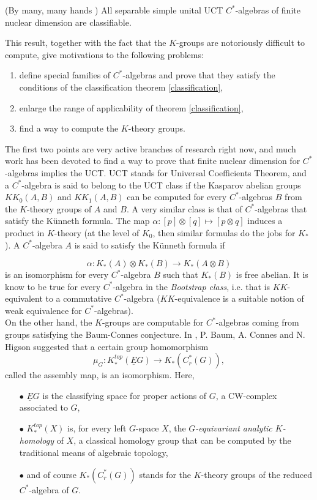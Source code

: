 \begin{theorem}\label{classification}(By many, many hands \cite{WinterClassification}) All separable simple unital UCT $C^*$-algebras of finite nuclear dimension are classifiable.
\end{theorem}

This result, together with the fact that the $K$-groups are notoriously difficult to compute, give motivations to the following problems:
\begin{enumerate}
\item define special families of $C^*$-algebras and prove that they satisfy the conditions of the classification theorem \ref{classification},
\item enlarge the range of applicability of theorem \ref{classification},
\item find a way to compute the $K$-theory groups.
\end{enumerate}    

The first two points are very active branches of research right now, and much work has been devoted to find a way to prove that finite nuclear dimension for $C^*$-algebras implies the UCT. UCT stands for Universal Coefficients Theorem, and a $C^*$-algebra is said to belong to the UCT class if the Kasparov abelian groups $KK_0(A,B)$ and $KK_1(A,B)$ can be computed for every $C^*$-algebras $B$ from the $K$-theory groups of $A$ and $B$. A very similar class is that of $C^*$-algebras that satisfy the K\"unneth formula. The map $\alpha: [p]\otimes [q] \mapsto [p\otimes q]$ induces a product in $K$-theory (at the level of $K_0$, then similar formulas do the jobs for $K_*$). A $C^*$-algebra $A$ is said to satisfy the K\"unneth formula if 

\[\alpha: K_*(A) \otimes K_*(B)\rightarrow K_*(A\otimes B)\]
 is an isomorphism for every $C^*$-algebra $B$ such that $K_*(B)$ is free abelian. It is know to be true for every $C^*$-algebra in the \textit{Bootstrap class}, i.e. that is $KK$-equivalent to a commutative $C^*$-algebra ($KK$-equivalence is a suitable notion of weak equivalence for $C^*$-algebras).\\

On the other hand, the $K$-groups are computable for $C^*$-algebras coming from groups satisfying the Baum-Connes conjecture. In \cite{BaumConnesHigson}, P. Baum, A. Connes and N. Higson suggested that a certain group homomorphism
\[\mu_G : K_*^{top}(\underline E G) \rightarrow K_*(C_r^*(G)), \]
called the assembly map, is an isomorphism. Here, 
\begin{itemize}
\item[$\bullet$] $\underline E G$ is the classifying space for proper actions of $G$, a CW-complex associated to $G$,
\item[$\bullet$] $K_*^{top}(X)$ is, for every left $G$-space $X$, the \textit{$G$-equivariant analytic $K$-homology} of $X$, a classical homology group that can be computed by the traditional means of algebraic topology,
\item[$\bullet$] and of course $K_*(C_r^*(G))$ stands for the $K$-theory groups of the reduced $C^*$-algebra of $G$. 
\end{itemize}

